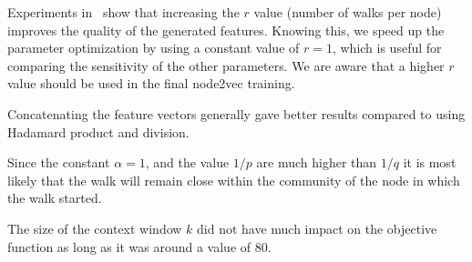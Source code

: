 Experiments in~\cite{node2vec} show that increasing the $r$ value (number of walks per node) improves the quality of the generated features. Knowing this, we speed up the parameter optimization by using a constant value of $r=1$, which is useful for comparing the sensitivity of the other parameters. We are aware that a higher $r$ value should be used in the final node2vec training.

Concatenating the feature vectors generally gave better results compared to using Hadamard product and division.

Since the constant $\alpha = 1$, and the value $1/p$ are much higher than $1/q$ it is most likely that the walk will remain close within the community of the node in which the walk started.

The size of the context window $k$ did not have much impact on the objective function as long as it was around a value of $80$.


